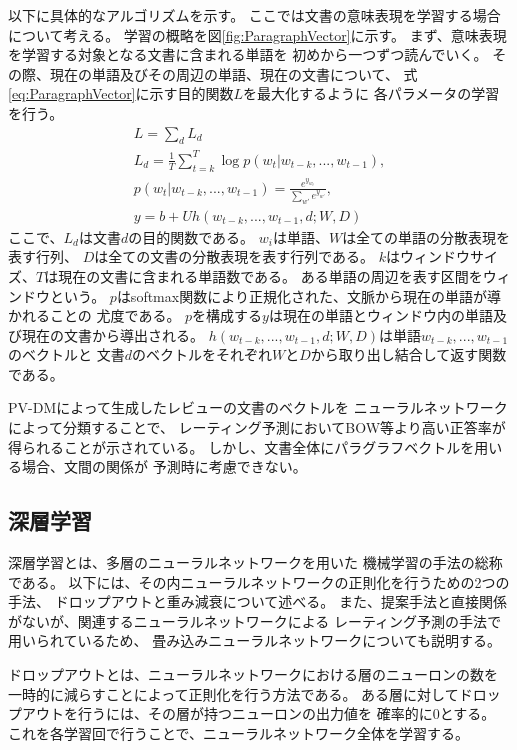 以下に具体的なアルゴリズムを示す。
ここでは文書の意味表現を学習する場合について考える。
学習の概略を図\ref{fig:ParagraphVector}に示す。
まず、意味表現を学習する対象となる文書に含まれる単語を
初めから一つずつ読んでいく。
その際、現在の単語及びその周辺の単語、現在の文書について、
式\ref{eq:ParagraphVector}に示す目的関数$L$を最大化するように
各パラメータの学習を行う。
\begin{gather} \label{eq:ParagraphVector}
  L = \sum_d L_d \\
  L_d = \frac{1}{T} \sum^{T}_{t = k} \log p(w_t | w_{t-k}, ..., w_{t-1}),
     \nonumber \\
  p(w_t | w_{t-k}, ..., w_{t-1}) = \frac{e^{y_{w_t}}}{\sum_{w'} e^{y_{w'}}},
    \nonumber \\
  y = b + Uh(w_{t-k}, ..., w_{t-1}, d; W, D) \nonumber
\end{gather}
ここで、$L_d$は文書$d$の目的関数である。
$w_i$は単語、$W$は全ての単語の分散表現を表す行列、
$D$は全ての文書の分散表現を表す行列である。
$k$はウィンドウサイズ、$T$は現在の文書に含まれる単語数である。
ある単語の周辺を表す区間をウィンドウという。
$p$はsoftmax関数により正規化された、文脈から現在の単語が導かれることの
尤度である。
$p$を構成する$y$は現在の単語とウィンドウ内の単語及び現在の文書から導出される。
$h(w_{t-k}, ..., w_{t-1}, d; W, D)$は単語$w_{t-k}, ..., w_{t-1}$のベクトルと
文書$d$のベクトルをそれぞれ$W$と$D$から取り出し結合して返す関数である。

PV-DMによって生成したレビューの文書のベクトルを
ニューラルネットワークによって分類することで、
レーティング予測においてBOW等より高い正答率が得られることが示されている。
しかし、文書全体にパラグラフベクトルを用いる場合、文間の関係が
予測時に考慮できない。


\subsection{深層学習}

深層学習とは、多層のニューラルネットワークを用いた
機械学習の手法の総称である\cite{takayuki15}。
以下には、その内ニューラルネットワークの正則化を行うための2つの手法、
ドロップアウトと重み減衰について述べる。
また、提案手法と直接関係がないが、関連するニューラルネットワークによる
レーティング予測の手法\cite{nal14,rie14,duyu15}で用いられているため、
畳み込みニューラルネットワークについても説明する。

ドロップアウトとは、ニューラルネットワークにおける層のニューロンの数を
一時的に減らすことによって正則化を行う方法である。
ある層に対してドロップアウトを行うには、その層が持つニューロンの出力値を
確率的に0とする。
これを各学習回で行うことで、ニューラルネットワーク全体を学習する。

